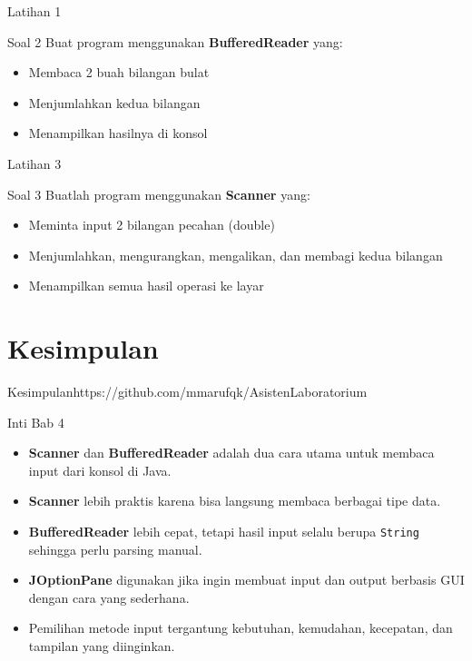 \documentclass{beamer}
\begin{document}
\begin{frame}{Latihan 1}
  \begin{block}{Soal 2}
    Buat program menggunakan \textbf{BufferedReader} yang:
    \begin{itemize}
      \item Membaca 2 buah bilangan bulat
      \item Menjumlahkan kedua bilangan
      \item Menampilkan hasilnya di konsol
    \end{itemize}
  \end{block}
\end{frame}

\begin{frame}{Latihan 3}
  \begin{block}{Soal 3}
    Buatlah program menggunakan \textbf{Scanner} yang:
    \begin{itemize}
      \item Meminta input 2 bilangan pecahan (double)
      \item Menjumlahkan, mengurangkan, mengalikan, dan membagi kedua bilangan
      \item Menampilkan semua hasil operasi ke layar
    \end{itemize}
  \end{block}
\end{frame}

\section{Kesimpulan}
\begin{frame}{Kesimpulan}https://github.com/mmarufqk/AsistenLaboratorium
  \begin{alertblock}{Inti Bab 4}
    \begin{itemize}
      \item \textbf{Scanner} dan \textbf{BufferedReader} adalah dua cara utama untuk membaca input dari konsol di Java.
      \item \textbf{Scanner} lebih praktis karena bisa langsung membaca berbagai tipe data.
      \item \textbf{BufferedReader} lebih cepat, tetapi hasil input selalu berupa \texttt{String} sehingga perlu parsing manual.
      \item \textbf{JOptionPane} digunakan jika ingin membuat input dan output berbasis GUI dengan cara yang sederhana.
      \item Pemilihan metode input tergantung kebutuhan, kemudahan, kecepatan, dan tampilan yang diinginkan.
    \end{itemize}
  \end{alertblock}
\end{frame}
\end{document}
